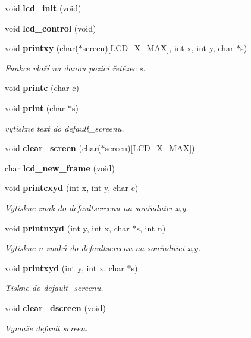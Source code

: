 \begin{DoxyCompactItemize}
\item 
void {\bf lcd\_\-init} (void)
\item 
void {\bf lcd\_\-control} (void)
\item 
void {\bf printxy} (char($\ast$screen)[LCD\_\-X\_\-MAX], int x, int y, char $\ast$s)
\begin{DoxyCompactList}\small\item\em Funkce vloží na danou pozici řetězec {\itshape s\/}. \item\end{DoxyCompactList}\item 
void {\bf printc} (char c)
\item 
void {\bf print} (char $\ast$s)
\begin{DoxyCompactList}\small\item\em vytiskne text do default\_\-screenu. \item\end{DoxyCompactList}\item 
void {\bf clear\_\-screen} (char($\ast$screen)[LCD\_\-X\_\-MAX])
\item 
char {\bf lcd\_\-new\_\-frame} (void)
\item 
void {\bf printcxyd} (int x, int y, char c)
\begin{DoxyCompactList}\small\item\em Vytiskne znak do defaultscreenu na souřadnici x,y. \item\end{DoxyCompactList}\item 
void {\bf printnxyd} (int y, int x, char $\ast$s, int n)
\begin{DoxyCompactList}\small\item\em Vytiskne n znaků do defaultscreenu na souřadnici x,y. \item\end{DoxyCompactList}\item 
void {\bf printxyd} (int y, int x, char $\ast$s)
\begin{DoxyCompactList}\small\item\em Tiskne do default\_\-screenu. \item\end{DoxyCompactList}\item 
void {\bf clear\_\-dscreen} (void)
\begin{DoxyCompactList}\small\item\em Vymaže default screen. \item\end{DoxyCompactList}\item 

\end{DoxyCompactItemize}
